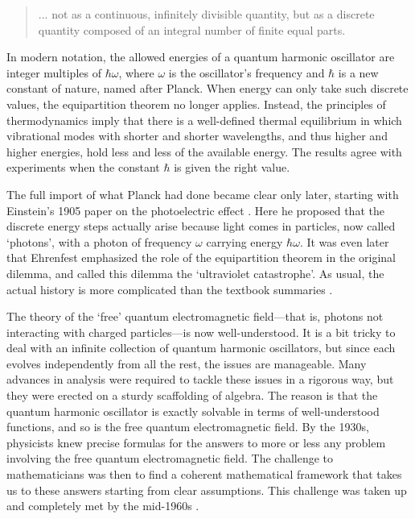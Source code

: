 \documentclass[12pt]{article}
\begin{document}
\begin{quote}
... not as a continuous, infinitely divisible quantity, but as a discrete quantity composed of an integral number of finite equal parts.
\end{quote}

In modern notation, the allowed energies of a quantum harmonic oscillator are integer multiples of $\hbar \omega$, where $\omega$ is the oscillator's frequency and $\hbar$ is a new constant of nature, named after Planck.   When energy can only take such discrete values, the equipartition theorem no longer applies.  Instead, the principles of thermodynamics imply that there is a well-defined thermal equilibrium in which vibrational modes with shorter and shorter wavelengths, and thus higher and higher energies, hold less and less of the available energy.   The results agree with experiments when the constant $\hbar$ is given the right value.

The full import of what Planck had done became clear only later, starting with Einstein's 1905 paper on the photoelectric effect \cite{Einstein}.  Here he proposed that the discrete energy steps actually arise because light comes in particles, now called `photons', with a photon of frequency $\omega$ carrying energy $\hbar \omega$.   It was even later that Ehrenfest emphasized the role of the equipartition theorem in the original dilemma, and called this dilemma the `ultraviolet catastrophe'.  As usual, the actual history is more complicated than the textbook summaries \cite{Kragh}.

The theory of the `free' quantum electromagnetic field---that is, photons not interacting with charged particles---is now well-understood.   It is a bit tricky to deal with an infinite collection of quantum harmonic oscillators, but since each evolves independently from all the rest, the issues are manageable.  Many advances in analysis were required to tackle these issues in a rigorous way, but they were erected on a sturdy scaffolding of algebra.  The reason is that the quantum harmonic oscillator is exactly solvable in terms of well-understood functions, and so is the free quantum electromagnetic field.   By the 1930s,  physicists knew precise formulas for the answers to more or less any problem involving the free quantum electromagnetic field.  The challenge to mathematicians was then to find a coherent mathematical framework that takes us to these answers starting from clear assumptions.  This challenge was taken up and completely met by the mid-1960s \cite{BSZ}.
\end{document}
